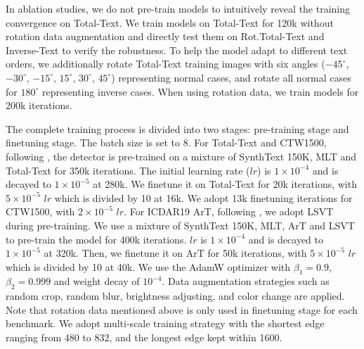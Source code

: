 \documentclass[letterpaper]{article} \usepackage{aaai23}  \usepackage{times}  \usepackage{helvet}  \usepackage{courier}  \usepackage[hyphens]{url}  \usepackage{graphicx} \urlstyle{rm}
\begin{document}
In ablation studies, we do not pre-train models to intuitively reveal the training convergence on Total-Text. We train models on Total-Text for 120k without rotation data augmentation and directly test them on Rot.Total-Text and Inverse-Text to verify the robustness. To help the model adapt to different text orders, we additionally rotate Total-Text training images with six angles ($-45^{\circ}$, $-30^{\circ}$, $-15^{\circ}$, $15^{\circ}$, $30^{\circ}$, $45^{\circ}$) representing normal cases, and rotate all normal cases for $180^{\circ}$ representing inverse cases. When using rotation data, we train models for 200k iterations.

The complete training process is divided into two stages: pre-training stage and finetuning stage. The batch size is set to 8. For Total-Text and CTW1500, following \cite{zhang2022text,9525302}, the detector is pre-trained on a mixture of SynthText 150K, MLT \cite{nayef2019icdar2019} and Total-Text for 350k iterations. The initial learning rate ($lr$) is $1 \times 10^{-4}$ and is decayed to $1 \times 10^{-5}$ at 280k. We finetune it on Total-Text for 20k iterations, with $5 \times 10^{-5}$ $lr$ which is divided by 10 at 16k. We adopt 13k finetuning iterations for CTW1500, with $2 \times 10^{-5}$ $lr$. For ICDAR19 ArT, following \cite{du2022i3cl,baek2020character}, we adopt LSVT \cite{sun2019icdar} during pre-training. We use a mixture of SynthText 150K, MLT, ArT and LSVT to pre-train the model for 400k iterations. $lr$ is $1 \times 10^{-4}$ and is decayed to $1 \times 10^{-5}$ at 320k. Then, we finetune it on ArT for 50k iterations, with $5 \times 10^{-5}$ $lr$ which is divided by 10 at 40k. We use the AdamW optimizer \cite{Loshchilov2019DecoupledWD} with $\beta_1=0.9$, $\beta_2=0.999$ and weight decay of $10^{-4}$. Data augmentation strategies such as random crop, random blur, brightness adjusting, and color change are applied. Note that rotation data mentioned above is only used in finetuning stage for each benchmark. We adopt multi-scale training strategy with the shortest edge ranging from 480 to 832, and the longest edge kept within 1600.
\end{document}
